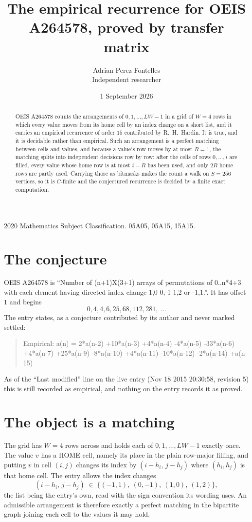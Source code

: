 \documentclass[11pt,a4paper]{article}
\title{The empirical recurrence for OEIS A264578, proved by transfer matrix}
\author{Adrian Perez Fontelles\\ \small Independent researcher}
\date{1 September 2026}
\theoremstyle{plain}
\theoremstyle{definition}
\begin{document}
\maketitle

\begin{abstract}
OEIS A264578 counts the arrangements of $0,1,\dots,LW-1$ in a grid of $W=4$ rows in which
every value moves from its home cell by an index change on a short list, and it carries an
empirical recurrence of order $15$ contributed by R.~H.~Hardin. It is true, and it is
decidable rather than empirical. Such an arrangement is a perfect matching between cells and
values, and because a value's row moves by at most $R=1$, the matching splits into
independent decisions row by row: after the cells of rows $0,\dots,i$ are filled,
every value whose home row is at most $i-R$ has been used, and only $2R$ home rows are
partly used. Carrying those as bitmasks makes the count a walk on $S=256$ vertices, so it is
$C$-finite and the conjectured recurrence is decided by a finite exact computation.
\end{abstract}

\noindent\small 2020 Mathematics Subject Classification. 05A05, 05A15, 15A15.\normalsize

\section{The conjecture}

OEIS A264578 is ``Number of (n+1)X(3+1) arrays of permutations of 0..n*4+3 with each element having directed index change 1,0 0,-1 1,2 or -1,1.''. It has offset $1$ and begins
\[
0, 4, 4, 6, 25, 68, 112, 281,\ \dots
\]
The entry states, as a conjecture contributed by its author and never marked settled:
\begin{quote}
Empirical: a(n) = 2*a(n-2) +10*a(n-3) +4*a(n-4) -4*a(n-5) -33*a(n-6) +4*a(n-7) +25*a(n-9) -8*a(n-10) +4*a(n-11) -10*a(n-12) -2*a(n-14) +a(n-15)
\end{quote}
As of the ``Last modified'' line on the live entry (Nov 18 2015 20:30:58, revision 5) this is still
recorded as empirical, and nothing on the entry records it as proved.

\section{The object is a matching}

The grid has $W=4$ rows across and holds each of $0,1,\dots,LW-1$ exactly once. The value
$v$ has a HOME cell, namely its place in the plain row-major filling, and putting $v$ in cell
$(i,j)$ changes its index by $(i-h_i,\,j-h_j)$ where $(h_i,h_j)$ is that home cell. The entry
allows the index changes
\[
(i-h_i,\,j-h_j)\;\in\;\{(-1,1),\ (0,-1),\ (1,0),\ (1,2)\},
\]
the list being the entry's own, read with the sign convention its wording uses. An admissible
arrangement is therefore exactly a perfect matching in the bipartite graph joining each cell to
the values it may hold.
\end{document}
